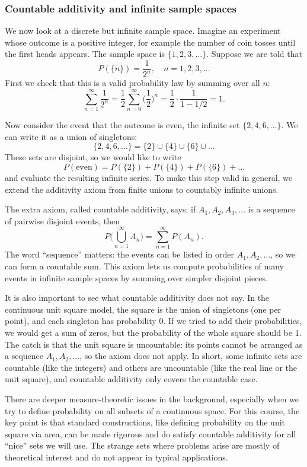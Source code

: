 \subsubsection{Countable additivity and infinite sample spaces}

We now look at a discrete but infinite sample space. Imagine an experiment whose outcome is a positive integer, for example the number of coin tosses until the first heads appears. The sample space is \(\{1,2,3,\dots\}\). Suppose we are told that
\[
P(\{n\}) = \frac{1}{2^n}, \quad n = 1,2,3,\dots
\]
First we check that this is a valid probability law by summing over all \(n\):
\[
\sum_{n=1}^\infty \frac{1}{2^n}
= \frac{1}{2} \sum_{n=0}^\infty \Big(\frac{1}{2}\Big)^n
= \frac{1}{2} \cdot \frac{1}{1 - 1/2} = 1.
\]

Now consider the event that the outcome is even, the infinite set \(\{2,4,6,\dots\}\). We can write it as a union of singletons:
\[
\{2,4,6,\dots\} = \{2\} \cup \{4\} \cup \{6\} \cup \dots
\]
These sets are disjoint, so we would like to write
\[
P(\text{even}) = P(\{2\}) + P(\{4\}) + P(\{6\}) + \dots
\]
and evaluate the resulting infinite series. To make this step valid in general, we extend the additivity axiom from finite unions to countably infinite unions.

The extra axiom, called countable additivity, says: if \(A_1,A_2,A_3,\dots\) is a sequence of pairwise disjoint events, then
\[
P\Big(\bigcup_{n=1}^\infty A_n\Big) = \sum_{n=1}^\infty P(A_n).
\]
The word “sequence” matters: the events can be listed in order \(A_1,A_2,\dots\), so we can form a countable sum. This axiom lets us compute probabilities of many events in infinite sample spaces by summing over simpler disjoint pieces.

It is also important to see what countable additivity does not say. In the continuous unit square model, the square is the union of singletons (one per point), and each singleton has probability 0. If we tried to add their probabilities, we would get a sum of zeros, but the probability of the whole square should be 1. The catch is that the unit square is uncountable: its points cannot be arranged as a sequence \(A_1,A_2,\dots\), so the axiom does not apply. In short, some infinite sets are countable (like the integers) and others are uncountable (like the real line or the unit square), and countable additivity only covers the countable case.

There are deeper measure-theoretic issues in the background, especially when we try to define probability on all subsets of a continuous space. For this course, the key point is that standard constructions, like defining probability on the unit square via area, can be made rigorous and do satisfy countable additivity for all “nice” sets we will use. The strange sets where problems arise are mostly of theoretical interest and do not appear in typical applications.

